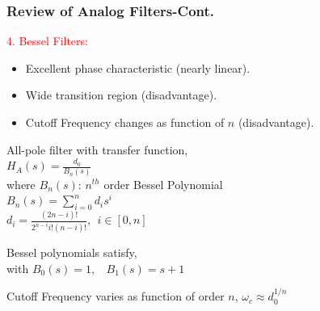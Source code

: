 \documentclass[mathserif, 10pt]{beamer} %
\begin{document}
\frame
{
\normalsize
\frametitle{Review of Analog Filters-Cont.}
\textcolor{red}{4. Bessel Filters:}\\ \vspace{.05in}
\begin{itemize}
	\item Excellent phase characteristic (nearly linear).
	\item Wide transition region (disadvantage).
	\item Cutoff Frequency changes as function of $n$ (disadvantage).
\end{itemize}
 All-pole filter with transfer function, \\
$H_A(s) = \frac{d_0}{B_n(s)}$\\ \vspace{.05in}
where $B_n(s)$: $n^{th}$ order Bessel Polynomial \\ \vspace{.05in}
  $B_n(s) = \sum\limits_{i=0}^n d_i s^i$\\ \vspace{.05in}
$d_i = \frac{(2n-i)!}{2^{n-i}i!(n-i)!},~~i \in[0,n]$\\ \vspace{.05in}

Bessel polynomials satisfy,  \\ \vspace{.05in}
with $B_0(s) = 1,~~~~B_1(s) = s+1$\\ \vspace{.05in}

Cutoff Frequency varies as function of order $n$,
$\omega_c \approx d_0^{1/n}$


}
\end{document}
